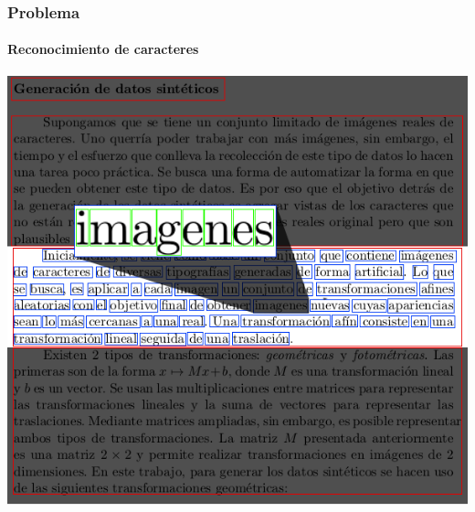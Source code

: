 		\begin{frame}
			\frametitle{Problema}
			\framesubtitle{Reconocimiento de caracteres}
			\begin{center}
				\includegraphics[height=0.65\paperheight]{imgs/texto_plano_det_caracteres.png}
			\end{center}
		\end{frame}
